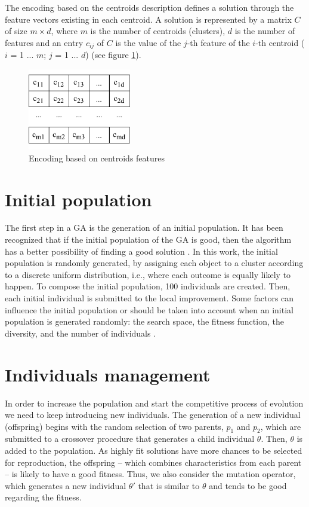 The encoding based on the centroids description defines a solution through the feature vectors existing in each centroid. A solution is represented by a matrix $C$ of size $m \times d$, where $m$ is the number of centroids (clusters), $d$ is the number of features and an entry $c_{ij}$ of $C$ is the value of the $j$-th feature of the $i$-th centroid ($i$ = 1 ... $m$; $j$ = 1 ... $d$) (see figure \ref{fig:centroids-encoding}).

\begin{figure}[h]
  \begin{center}
    \includegraphics[width=0.4\textwidth]{img/centroids-encoding}
    \caption{Encoding based on centroids features}\label{fig:centroids-encoding}
  \end{center}
\end{figure}

\section{Initial population}
\label{sec:initial-population}
The first step in a GA is the generation of an initial population. It has been recognized that if the initial population of the GA is good, then the algorithm has a better possibility of finding a good solution \cite{Burke2004, Zitzler2000}. In this work, the initial population is randomly generated, by assigning each object to a cluster according to a discrete uniform distribution, i.e., where each outcome is equally likely to happen. To compose the initial population, 100 individuals are created. Then, each initial individual is submitted to the local improvement. Some factors can influence the initial population or should be taken into account when an initial population is generated randomly: the search space, the fitness function, the diversity, and the number of individuals \cite{DiazGomez2007}.

\section{Individuals management}
\label{individuals-management}
In order to increase the population and start the competitive process of evolution we need to keep introducing new individuals. The generation of a new individual (offspring) begins with the random selection of two parents, $p_1$ and $p_2$, which are submitted to a crossover procedure that generates a child individual $\theta$. Then, $\theta$ is added to the population. As highly fit solutions have more chances to be selected for reproduction, the offspring -- which combines characteristics from each parent -- is likely to have a good fitness. Thus, we also consider the mutation operator, which generates a new individual $\theta'$ that is similar to $\theta$ and tends to be good regarding the fitness.


